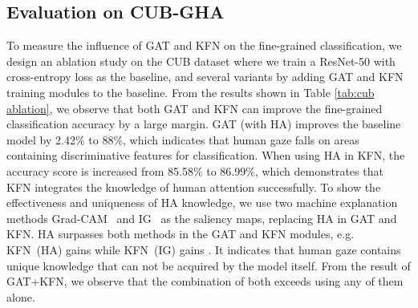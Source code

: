 \documentclass{bmvc2k}
\begin{document}
\subsection{Evaluation on CUB-GHA}
 To measure the influence of GAT and KFN on the fine-grained classification, we design an ablation study on the CUB dataset where we train a ResNet-50 with cross-entropy loss as the baseline, and several variants by adding GAT and KFN training modules to the baseline. 
From the results shown in Table \ref{tab:cub ablation}, we observe that both GAT and KFN can improve the fine-grained classification accuracy by a large margin. GAT (with HA) improves the baseline model by 2.42\% to 88\%, which indicates that human gaze falls on areas containing discriminative features for classification. When using HA in KFN, the accuracy score is increased from 85.58\% to 86.99\%, which demonstrates that KFN integrates the knowledge of human attention successfully. To show the effectiveness and uniqueness of HA knowledge, we use two machine explanation methods Grad-CAM~\cite{20_grad_cam} and IG~\cite{IG} 
as the saliency maps, replacing HA in GAT and KFN. HA surpasses both methods in the GAT and KFN modules, e.g. KFN~(HA) gains  while KFN~(IG) gains . It indicates that human gaze contains unique knowledge that can not be acquired by the model itself. From the result of GAT+KFN, we observe that the combination of both exceeds using any of them alone. 
\end{document}
